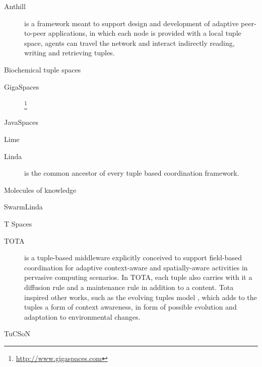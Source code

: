 \documentclass[12pt,a4paper,twoside,openright]{book}
\begin{document}
\begin{description}
 \item[Anthill] \cite{anthill} is a framework meant to support design and development of adaptive peer-to-peer applications, in which each node is provided with a local tuple space, agents can travel the network and interact indirectly reading, writing and retrieving tuples.

 \item[Biochemical tuple spaces] \cite{biochemicalTupleSpaces}

 \item[GigaSpaces]\footnote{\url{http://www.gigaspaces.com}}

 \item[JavaSpaces] \cite{javaspaces1999,javaspaces}

 \item[Lime] \cite{murphy2006lime}

 \item[Linda] \cite{linda-toplas7} is the common ancestor of every tuple based coordination framework.

 \item[Molecules of knowledge] \cite{mariani2013molecules}

 \item[SwarmLinda] \cite{swarmlinda}

 \item[T Spaces] \cite{tspaces-ibmsj37}

 \item[TOTA] \cite{mamei2009acm, tota2} is a tuple-based middleware explicitly conceived to support field-based coordination for adaptive context-aware and spatially-aware activities in pervasive computing scenarios.
 In TOTA, each tuple also carries with it a diffusion rule and a maintenance rule in addition to a content. Tota inspired other works, such as the evolving tuples model \cite{evolvingtuples}, which adds to the tuples a form of context awareness, in form of possible evolution and adaptation to environmental changes.

 \item[TuCSoN] \cite{tucson-aamas99}

\end{description}
\end{document}
